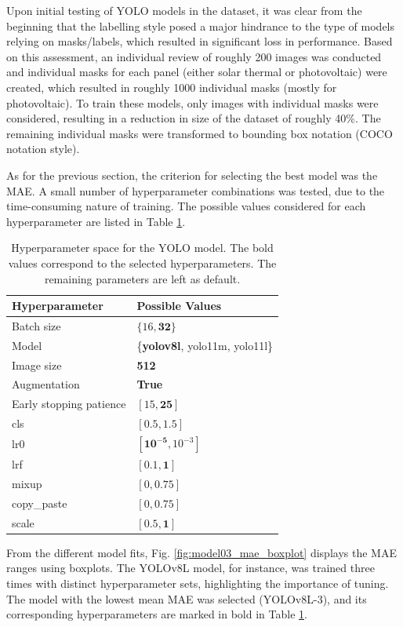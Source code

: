 \documentclass[conference]{IEEEtran}
\begin{document}
Upon initial testing of YOLO models in the dataset, it was clear from the beginning that the labelling style posed a major hindrance to the type of models relying on masks/labels, which resulted in significant loss in performance. Based on this assessment, an individual review of roughly 200 images was conducted and individual masks for each panel (either solar thermal or photovoltaic) were created, which resulted in roughly 1000 individual masks (mostly for photovoltaic). To train these models, only images with individual masks were considered, resulting in a reduction in size of the dataset of roughly 40\%. The remaining individual masks were transformed to bounding box notation (COCO notation style).

As for the previous section, the criterion for selecting the best model was the MAE. A small number of hyperparameter combinations was tested, due to the time-consuming nature of training. The possible values considered for each hyperparameter are listed in Table \ref{parametrosobjid}.

\begin{table}[H]
\centering
\caption{Hyperparameter space for the YOLO model. The bold values correspond to the selected hyperparameters. The remaining parameters are left as default.}
\label{parametrosobjid}
\begin{tabular}{ll}
\toprule
\textbf{Hyperparameter} & \textbf{Possible Values} \\
\midrule
Batch size & $\{16, \mathbf{32}\}$ \\
Model & \{\textbf{yolov8l}, yolo11m, yolo11l\} \\
Image size & \textbf{512} \\
Augmentation & \textbf{True} \\
Early stopping patience & $[15, \mathbf{25}]$ \\
cls & $[0.5, \mathbf{1.5}]$ \\
lr0 & $[\mathbf{10^{-5}}, 10^{-3}]$ \\
lrf & $[0.1, \mathbf{1}]$ \\
mixup & $[0, \mathbf{0.75}]$ \\
copy\_paste & $[0, \mathbf{0.75}]$ \\
scale & $[0.5, \mathbf{1}]$ \\
\bottomrule
\end{tabular}
\end{table}

From the different model fits, Fig. \ref{fig:model03_mae_boxplot} displays the MAE ranges using boxplots. The YOLOv8L model, for instance, was trained three times with distinct hyperparameter sets, highlighting the importance of tuning. The model with the lowest mean MAE was selected (YOLOv8L-3), and its corresponding hyperparameters are marked in bold in Table \ref{parametrosobjid}.
\end{document}
